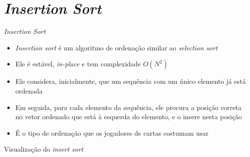 \section{\it Insertion Sort}

\begin{frame}[fragile]{\it Insertion Sort}

    \begin{itemize}
        \item \textit{Insertion sort} é um algoritmo de ordenação similar ao \textit{selection
            sort}

        \item Ele é estável, \textit{in-place} e tem complexidade $O(N^2)$

        \item Ele considera, inicialmente, que um sequência com um único elemento já 
            está ordenada

        \item Em seguida, para cada elemento da sequência, ele procura a posição correta
            no vetor ordenado que está à esquerda do elemento, e o insere nesta posição

        \item É o tipo de ordenação que os jogadores de cartas costumam usar
        
    \end{itemize}

\end{frame}

\begin{frame}[fragile]{Visualização do {\it insert sort}}


\end{frame}

